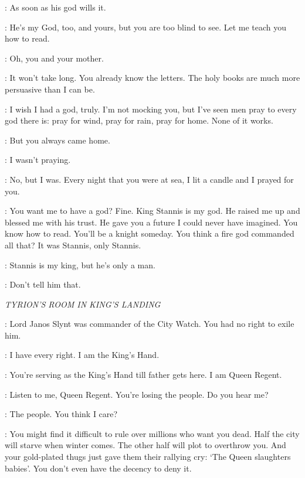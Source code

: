 \DAVOS: As soon as his god wills it.

\MATTHOS: He's my God, too, and yours, but you are too blind to see. Let me teach you how to read.

\DAVOS: Oh, you and your mother.

\MATTHOS: It won't take long. You already know the letters. The holy books are much more persuasive than I can be.

\DAVOS: I wish I had a god, truly. I'm not mocking you, but I've seen men pray to every god there is: pray for wind, pray for rain, pray for home. None of it works.

\MATTHOS: But you always came home.

\DAVOS: I wasn't praying.

\MATTHOS: No, but I was. Every night that you were at sea, I lit a candle and I prayed for you.

\DAVOS: You want me to have a god? Fine. King Stannis is my god. He raised me up and blessed me with his trust. He gave you a future I could never have imagined. You know how to read. You'll be a knight someday. You think a fire god commanded all that? It was Stannis, only Stannis.

\MATTHOS: Stannis is my king, but he's only a man.

\DAVOS: Don't tell him that.



\scene

\textit{TYRION'S ROOM IN KING'S LANDING}


\CERSEI: Lord Janos Slynt was commander of the City Watch. You had no right to exile him.

\TYRION: I have every right. I am the King's Hand.

\CERSEI: You're serving as the King's Hand till father gets here. I am Queen Regent.

\TYRION: Listen to me, Queen Regent. You're losing the people. Do you hear me?


\CERSEI: The people. You think I care?

\TYRION: You might find it difficult to rule over millions who want you dead. Half the city will starve when winter comes. The other half will plot to overthrow you. And your gold-plated thugs just gave them their rallying cry: `The Queen slaughters babies'. You don't even have the decency to deny it.

